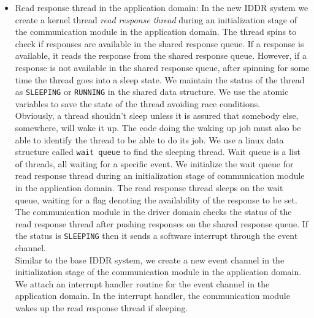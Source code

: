 \begin{itemize}
\item Read response thread in the application domain: 
In the new IDDR system we create a kernel thread \textit{read response thread} during an initialization stage of the communication module in the application domain. The thread spins to check if responses are available in the shared response queue. If a response is available, it reads the response from the shared response queue. However, if a response is not available in the shared response queue, after spinning for some time the thread goes into a sleep state. We maintain the status of the thread as \texttt{SLEEPING} or \texttt{RUNNING} in the shared data structure. We use the atomic variables to save the state of the thread avoiding race conditions. 
\\[3mm]
Obviously, a thread shouldn't sleep unless it is assured that somebody else, somewhere, will wake it up. The code doing the waking up job must also be able to identify the thread to be able to do its job. We use a linux data structure called \texttt{wait queue} to find the sleeping thread. Wait queue is a list of threads, all waiting for a specific event\cite{Galvin, Bovet:2005:ULK:1077084}. We initialize the wait queue for read response thread during an initialization stage of communication module in the application domain. The read response thread sleeps on the wait queue, waiting for a flag denoting the availability of the response to be set. The communication module in the driver domain checks the status of the read response thread after pushing responses on the shared response queue. If the status is \texttt{SLEEPING} then it sends a software interrupt through the event channel.
\\[3mm]
Similar to the base IDDR system, we create a new event channel in the initialization stage of the communication module in the application domain. We attach an interrupt handler routine for the event channel in the application domain. In the interrupt handler, the communication module wakes up the read response thread if sleeping. 


\end{itemize}
